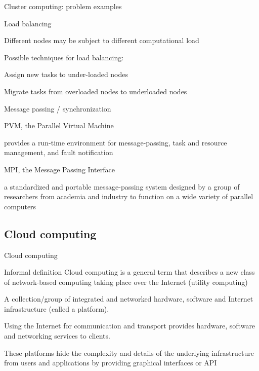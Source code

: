 \begin{frame}{Cluster computing: problem examples}

\begin{block}{Load balancing}
\BI
\item Different nodes may be subject to different computational load
\item Possible techniques for load balancing:
  \BI
  \item Assign new tasks to under-loaded nodes
  \item Migrate tasks from overloaded nodes to underloaded nodes
  \EI
\EI

\end{block}

\begin{block}{Message passing / synchronization}
\BI
\item PVM, the Parallel Virtual Machine
\BI
\item provides a run-time environment for message-passing, task and resource management, and fault notification
\EI
\item MPI, the Message Passing Interface
\BI
\item a standardized and portable message-passing system designed by a group of researchers from academia and industry to function on a wide variety of parallel computers
\EI
\EI
\end{block}

\end{frame}

\subsection{Cloud computing}

\begin{frame}{Cloud computing}

\begin{block}{Informal definition}	
Cloud computing is a general term that describes a new class of network-based 
computing taking place over the Internet (\alert{utility computing})
\end{block}
\medskip
\BI
\item A collection/group of integrated and networked hardware, software and Internet infrastructure (called a platform).
\item Using the Internet for communication and transport provides hardware, software and networking services to clients.
\item These platforms hide the complexity and details of the underlying infrastructure from users and applications by 
providing graphical interfaces or API
\EI
\end{frame}

